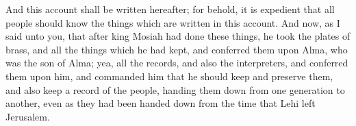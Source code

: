 \bverse \iffalse And this account shall be written hereafter; for behold, it is expedient that all people should know the things which are written in this account. \fi
And this account shall be written hereafter; for behold, it is expedient that all people should know the things which are written in this account.
\bverse \iffalse And now, as I said unto you, that after king Mosiah had done these things, he took the plates of brass, and all the things which he had kept, and conferred them upon Alma, who was the son of Alma; yea, all the records, and also the interpreters, and conferred them upon him, and commanded him that he should keep and preserve them, and also keep a record of the people, handing them down from one generation to another, even as they had been handed down from the time that Lehi left Jerusalem. \fi
And now, as I said unto you, that after king Mosiah had done these things, he took the plates of brass, and all the things which he had kept, and conferred them upon Alma, who was the son of Alma; yea, all the records, and also the interpreters, and conferred them upon him, and commanded him that he should keep and preserve them, and also keep a record of the people, handing them down from one generation to another, even as they had been handed down from the time that Lehi left Jerusalem.

